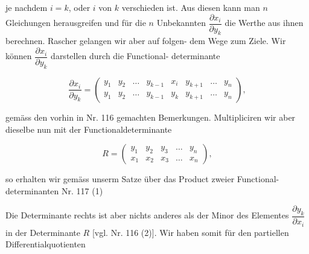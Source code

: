 je nachdem $i = k$, oder $i$ von $k$ verschieden ist. Aus diesen kann
man $n$ Gleichungen herausgreifen und für die $n$ Unbekannten $\dfrac{\partial x_i}{\partial y_k}$ die
Werthe aus ihnen berechnen. Rascher gelangen wir aber auf folgen-
dem Wege zum Ziele. Wir können $\dfrac{\partial x_i}{\partial y_k}$ darstellen durch die Functional-
determinante

\[
\dfrac{\partial x_i}{\partial y_k} = \begin{pmatrix} y_1 & y_2 & \ldots & y_{k-1} & x_i & y_{k+1} & \ldots & y_n \\ y_1 & y_2 & \ldots & y_{k-1} & y_k & y_{k+1} & \ldots & y_n \end{pmatrix},
\]

gemäss den vorhin in Nr. 116 gemachten Bemerkungen. Multipliciren
wir aber dieselbe nun mit der Functionaldeterminante


\[
R = \begin{pmatrix} y_1 & y_2 & y_3 & \ldots & y_n \\ x_1 & x_2 & x_3 & \ldots & x_n \end{pmatrix},
\]

so erhalten wir gemäss unserm Satze über das Product zweier Functional-
determinanten Nr. 117 (1)


Die Determinante rechts ist aber nichts anderes als der Minor des
Elementes $\dfrac{\partial y_k}{\partial x_i}$ in der Determinante $R$ [vgl. Nr. 116 (2)]. Wir haben
somit für den partiellen Differentialquotienten


